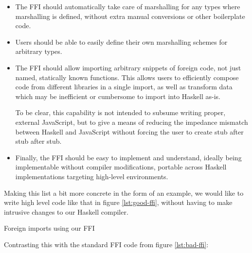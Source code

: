 \documentclass{sigplanconf}
\begin{document}
\begin{itemize}
\item
  The FFI should automatically take care of marshalling for any types where
  marshalling is defined, without extra manual conversions or other
  boilerplate code.
\item
  Users should be able to easily define their own marshalling schemes for
  arbitrary types.
\item
  The FFI should allow importing arbitrary snippets of foreign code, not just
  named, statically known functions. This allows users to efficiently compose
  code from different libraries in a single import,
  as well as transform data which may be inefficient or cumbersome to import
  into Haskell as-is.

  To be clear, this capability is not intended to subsume writing proper,
  external JavaScript, but to give a means of reducing the impedance mismatch
  between Haskell and JavaScript without forcing the user to create stub after
  stub after stub.
\item
  Finally, the FFI should be easy to implement and understand, ideally being
  implementable without compiler modifications, portable across Haskell
  implementations targeting high-level environments.
\end{itemize}

Making this list a bit more concrete in the form of an example, we would like
to write high level code like that in figure \ref{lst:good-ffi}, without
having to make intrusive changes to our Haskell compiler.

\begin{listingfloat}
\caption{Foreign imports using our FFI}
\label{lst:good-ffi}
\end{listingfloat}

Contrasting this with the standard FFI code from figure \ref{lst:bad-ffi}:
\end{document}
